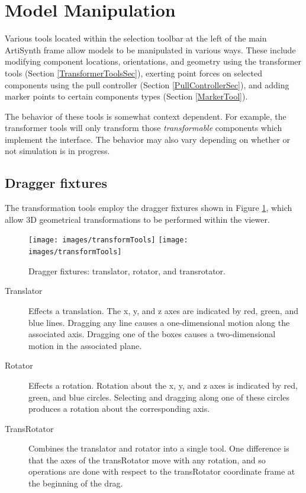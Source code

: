\documentclass{article}
\begin{document}
\section{Model Manipulation}
\label{ModelManipulation}

Various tools located within the selection toolbar at the left of the
main ArtiSynth frame allow models to be manipulated in various ways.
These include modifying component locations, orientations, and
geometry using the transformer tools (Section
\ref{TransformerToolsSec}), exerting point forces on selected
components using the pull controller (Section
\ref{PullControllerSec}), and adding marker points to certain
components types (Section \ref{MarkerTool}).

The behavior of these tools is somewhat context dependent.  For
example, the transformer tools will only transform those {\it
transformable} components which implement the
interface. The behavior may also vary depending on whether or not
simulation is in progress.

\subsection{Dragger fixtures}
\label{draggerFixturesSec}

The transformation tools employ the dragger fixtures shown
in Figure \ref{transformToolsFig}, which allow 3D geometrical
transformations to be performed within the viewer.

\begin{figure}[h]
\begin{center}
\iflatexml
\texttt{[image: images/transformTools]}
\else
\texttt{[image: images/transformTools]}
\fi
\end{center}
\caption{Dragger fixtures: translator, rotator, and transrotator.}%
\label{transformToolsFig}
\end{figure}

\begin{description}

\item[Translator]\mbox{}

Effects a translation. The x, y, and z axes are
indicated by red, green, and blue lines. Dragging any line causes
a one-dimensional motion along the associated axis. Dragging one
of the boxes causes a two-dimensional motion in the associated plane.

\item[Rotator]\mbox{}

Effects a rotation. Rotation about the
x, y, and z axes is indicated by red, green, and blue circles.
Selecting and dragging along one of these circles produces
a rotation about the corresponding axis.

\item[TransRotator]\mbox{}

Combines the translator and rotator into a single tool. One difference
is that the axes of the transRotator move with any rotation,
and so operations are done with respect to the transRotator coordinate frame
at the beginning of the drag.

\end{description}
\end{document}
